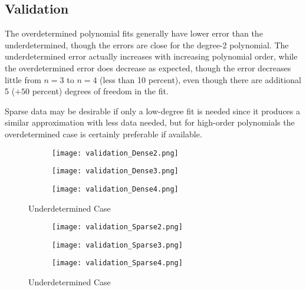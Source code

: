 \documentclass{template}
\begin{document}
\clearpage

\subsection{Validation}

The overdetermined polynomial fits generally have lower error than the underdetermined, though the errors are close for the degree-2 polynomial. The underdetermined error actually increases with increasing polynomial order, while the overdetermined error does decrease as expected, though the error decreases little from $n=3$ to $n=4$ (less than 10 percent), even though there are additional 5 ($+50$ percent) degrees of freedom in the fit. 

Sparse data may be desirable if only a low-degree fit is needed since it produces a similar approximation with less data needed, but for high-order polynomials the overdetermined case is certainly preferable if available.

\begin{figure}[h]
    \centering
    \begin{subfigure}{0.48\textwidth}
        \texttt{[image: validation\_Dense2.png]}
        \caption{}
        \label{}
    \end{subfigure}
    \begin{subfigure}{0.48\textwidth}
        \texttt{[image: validation\_Dense3.png]}
        \caption{}
        \label{}
    \end{subfigure}

    \begin{subfigure}{0.48\textwidth}
        \texttt{[image: validation\_Dense4.png]}
        \caption{}
        \label{}
    \end{subfigure}
    \caption{Underdetermined Case}
    \label{fig:validation_dense}
\end{figure}

\begin{figure}[h]
    \centering
    \begin{subfigure}{0.48\textwidth}
        \texttt{[image: validation\_Sparse2.png]}
        \caption{}
        \label{}
    \end{subfigure}
    \begin{subfigure}{0.48\textwidth}
        \texttt{[image: validation\_Sparse3.png]}
        \caption{}
        \label{}
    \end{subfigure}

    \begin{subfigure}{0.48\textwidth}
        \texttt{[image: validation\_Sparse4.png]}
        \caption{}
        \label{}
    \end{subfigure}
    \caption{Underdetermined Case}
    \label{fig:val_sparse}
\end{figure}


% 
% 
\end{document}
